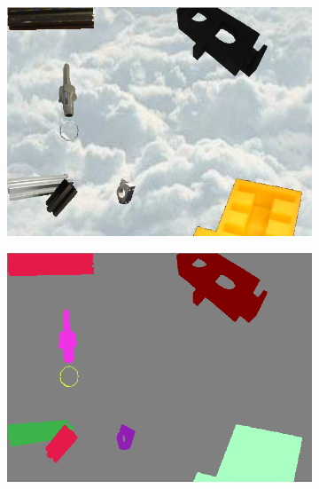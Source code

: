 \begin{figure}[h]
\begin{subfigure}{.24\textwidth}
			\includegraphics[width=1\linewidth]{images/sample_predictions/00017}
		\end{subfigure}
		\begin{subfigure}{.24\textwidth}
			\centering
			\includegraphics[width=1\linewidth]{images/sample_predictions/00017_size_gt}
		\end{subfigure}
		\begin{subfigure}{.24\textwidth}
			\centering

\end{subfigure}
\end{figure}
